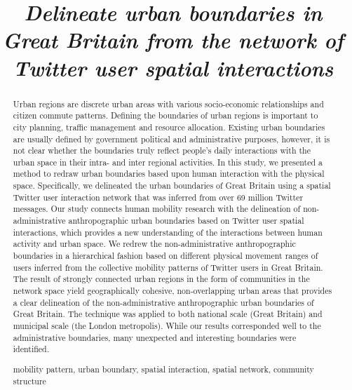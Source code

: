 \documentclass[]{tGIS2e}
\begin{document}



\title{{\itshape Delineate urban boundaries in Great Britain from the network of Twitter user spatial interactions} }
\maketitle

\begin{abstract}
Urban regions are discrete urban areas with various socio-economic relationships and citizen commute patterns.
Defining the boundaries of urban regions is important to city planning, traffic management and resource allocation.
Existing urban boundaries are usually defined by government political and administrative purposes, however, it is not clear whether the boundaries truly reflect people's daily interactions with the urban space in their intra- and inter regional activities.
In this study, we presented a method to redraw urban boundaries based upon human interaction with the physical space.
Specifically, we delineated the urban boundaries of Great Britain using a spatial Twitter user interaction network that was inferred from over 69 million Twitter messages.
Our study connects human mobility research with the delineation of non-administrative anthropographic urban boundaries based on Twitter user spatial interactions, which provides a new understanding of the interactions between human activity and urban space.
We redrew the non-administrative anthropographic boundaries in a hierarchical fashion based on different physical movement ranges of users inferred from the collective mobility patterns of Twitter users in Great Britain.
The result of strongly connected urban regions in the form of communities in the network space yield geographically cohesive, non-overlapping urban areas that provides a clear delineation of the non-administrative anthropographic urban boundaries of Great Britain.
The technique was applied to both national scale (Great Britain) and municipal scale (the London metropolis). 
While our results corresponded well to the administrative boundaries, many unexpected and interesting boundaries were identified.
\newline

 mobility pattern, urban boundary, spatial interaction, spatial network, community structure
\end{abstract}
\end{document}
